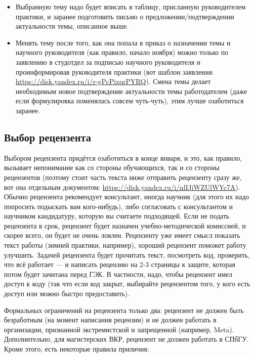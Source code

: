\documentclass{article}
\begin{document}
\begin{itemize}
    \item Выбранную тему надо будет вписать в таблицу, присланную руководителем практики, и заранее подготовить письмо о предложении/подтверждении актуальности темы, описанное выше.
    \item Менять тему после того, как она попала в приказ о назначении темы и научного руководителя (как правило, начало ноября) можно только по заявлению в студотдел за подписью научного руководителя и проинформировав руководителя практики (вот шаблон заявления: \url{https://disk.yandex.ru/i/r-gPcPixqrPYRQ}). Смена темы делает необходимым новое подтверждение актуальности темы работодателем (даже если формулировка поменялась совсем чуть-чуть), этим лучше озаботиться заранее.
\end{itemize}

\subsection{Выбор рецензента}

Выбором рецензента придётся озаботиться в конце января, и это, как правило, вызывает непонимание как со стороны обучающихся, так и со стороны рецензентов (поэтому стоит часть текста ниже отправить рецензенту сразу же, вот она отдельным документом: \url{https://disk.yandex.ru/i/nlIJiWZUlWYc7A}). Обычно рецензента рекомендует консультант, иногда научник (для этого их надо попросить подыскать вам кого-нибудь), либо согласовать с консультантом и научником кандидатуру, которую вы считаете подходящей. Если не подать рецензента в срок, рецензент будет назначен учебно-методической комиссией, и скорее всего, он будет не очень лоялен. Рецензенту уже имеет смысл показать текст работы (зимней практики, например), хороший рецензент поможет работу улучшить. Задачей рецензента будет прочитать текст, посмотреть код, проверить, что всё работает --- и написать рецензию на 2-3 страницы к защите, которая потом будет зачитана перед ГЭК. В частности, надо, чтобы рецензент имел доступ к коду (так что если код закрыт, выбирайте рецензентом того, у кого есть доступ или можно быстро предоставить).

Формальных ограничений на рецензента только два: рецензент не должен быть безработным (на момент написания рецензии) и не должен работать в организации, признанной экстремистской и запрещенной (например, Meta). Дополнительно, для магистерских ВКР, рецензент не должен работать в СПбГУ. Кроме этого, есть некоторые правила приличия:
\end{document}
